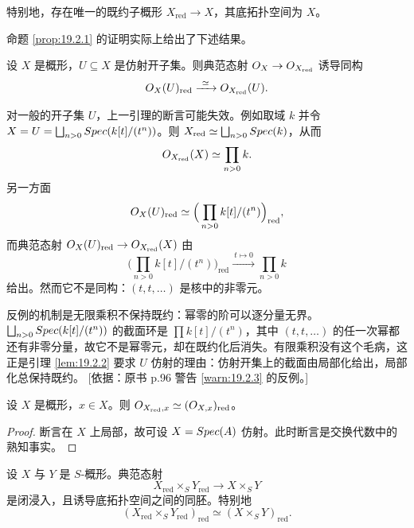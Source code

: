 特别地，存在唯一的既约子概形 $X_{\mathrm{red}}\to X$，其底拓扑空间为 $X$。

命题 \ref{prop:19.2.1} 的证明实际上给出了下述结果。

\begin{lemma}\label{lem:19.2.2}
设 $X$ 是概形，$U\subseteq X$ 是仿射开子集。则典范态射 $O_X\to O_{X_{\mathrm{red}}}$ 诱导同构
\[
\cO_X(U)_{\mathrm{red}}\xrightarrow{\ \simeq\ }\cO_{X_{\mathrm{red}}}(U).
\]
\end{lemma}

\begin{warning}\label{warn:19.2.3}
对一般的开子集 $U$，上一引理的断言可能失效。例如取域 $k$ 并令 $X=U=\bigsqcup_{n>0}Spec(k[t]/(t^n))$。则 $X_{\mathrm{red}}\simeq\bigsqcup_{n>0}Spec(k)$，从而
\[
O_{X_{\mathrm{red}}}(X)\simeq\prod_{n>0}k.
\]
另一方面
\[
O_X(U)_{\mathrm{red}}\simeq\Big(\prod_{n>0}k[t]/(t^n)\Big)_{\mathrm{red}},
\]
而典范态射 $O_X(U)_{\mathrm{red}}\to O_{X_{\mathrm{red}}}(X)$ 由
\[
\Big(\prod_{n>0}k[t]/(t^n)\Big)_{\mathrm{red}}\xrightarrow{\ t\mapsto0\ }\prod_{n>0}k
\]
给出。然而它不是同构：$(t,t,\dots)$ 是核中的非零元。
\end{warning}

\begin{yizhu}
反例的机制是无限乘积不保持既约：幂零的阶可以逐分量无界。$\bigsqcup_{n>0}Spec(k[t]/(t^n))$ 的截面环是 $\prod k[t]/(t^n)$，其中 $(t,t,\dots)$ 的任一次幂都还有非零分量，故它不是幂零元，却在既约化后消失。有限乘积没有这个毛病，这正是引理 \ref{lem:19.2.2} 要求 $U$ 仿射的理由：仿射开集上的截面由局部化给出，局部化总保持既约。
[依据：原书 p.96 警告 \ref{warn:19.2.3} 的反例。]
\end{yizhu}

\begin{lemma}\label{lem:19.2.4}
设 $X$ 是概形，$x\in X$。则 $O_{X_{\mathrm{red}},x}\simeq(O_{X,x})_{\mathrm{red}}$。
\end{lemma}

\begin{proof}
断言在 $X$ 上局部，故可设 $X=Spec(A)$ 仿射。此时断言是交换代数中的熟知事实。
\end{proof}

\begin{lemma}\label{lem:19.2.5}
设 $X$ 与 $Y$ 是 $S$-概形。典范态射
\[
X_{\mathrm{red}}\times_S Y_{\mathrm{red}}\to X\times_S Y
\]
是闭浸入，且诱导底拓扑空间之间的同胚。特别地
\[
(X_{\mathrm{red}}\times_S Y_{\mathrm{red}})_{\mathrm{red}}\simeq(X\times_S Y)_{\mathrm{red}}.
\]
\end{lemma}

